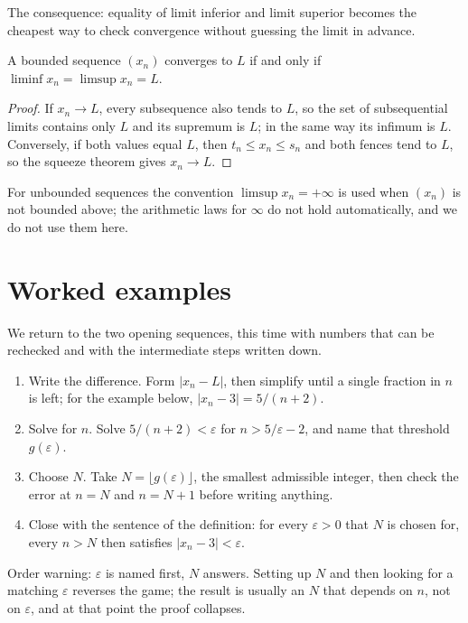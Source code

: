 The consequence: equality of limit inferior and limit superior becomes the cheapest way
to check convergence without guessing the limit in advance.

\begin{akibat}
A bounded sequence $(x_n)$ converges to $L$ if and only if
$\liminf x_n = \limsup x_n = L$.
\end{akibat}

\begin{proof}
If $x_n \to L$, every subsequence also tends to $L$, so the set of subsequential limits
contains only $L$ and its supremum is $L$; in the same way its infimum is $L$.
Conversely, if both values equal $L$, then $t_n \le x_n \le s_n$ and both fences tend to
$L$, so the squeeze theorem gives $x_n \to L$.
\end{proof}

For unbounded sequences the convention $\limsup x_n=+\infty$ is used when $(x_n)$ is not
bounded above; the arithmetic laws for $\infty$ do not hold automatically, and we do not
use them here.

\section{Worked examples}

We return to the two opening sequences, this time with numbers that can be rechecked and
with the intermediate steps written down.

\begin{resep}
\begin{enumerate}
  \item Write the difference. Form $|x_n-L|$, then simplify until a single fraction in
        $n$ is left; for the example below, $|x_n-3|=5/(n+2)$.
  \item Solve for $n$. Solve $5/(n+2)<\varepsilon$ for $n>5/\varepsilon-2$, and name
        that threshold $g(\varepsilon)$.
  \item Choose $N$. Take $N=\lfloor g(\varepsilon)\rfloor$, the smallest admissible
        integer, then check the error at $n=N$ and $n=N+1$ before writing anything.
  \item Close with the sentence of the definition: for every $\varepsilon>0$ that $N$
        is chosen for, every $n>N$ then satisfies $|x_n-3|<\varepsilon$.
\end{enumerate}
Order warning: $\varepsilon$ is named first, $N$ answers. Setting up $N$ and then
looking for a matching $\varepsilon$ reverses the game; the result is usually an $N$
that depends on $n$, not on $\varepsilon$, and at that point the proof collapses.
\end{resep}

